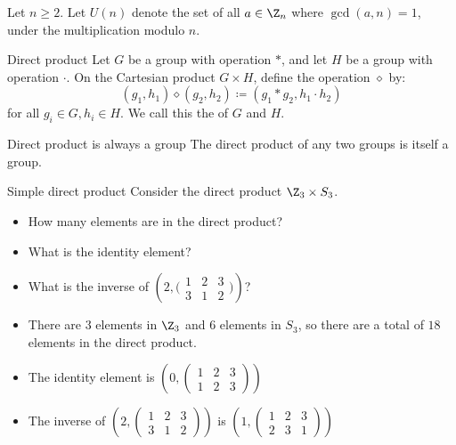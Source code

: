 Let $n \geq 2$. Let $U(n)$ denote the set of all $a \in \Z_n$ where $\gcd(a,n) = 1$, under the multiplication modulo $n$.

\begin{dfnbox}{Direct product}{}
    Let $G$ be a group with operation $*$, and let $H$ be a group with operation $\cdot$. On the Cartesian product $G \times H$, define the operation $\diamond$ by:
    \[ (g_1, h_1) \diamond (g_2, h_2) \coloneq (g_1 * g_2, h_1 \cdot h_2) \]
    for all $g_i \in G, h_i \in H$. We call this the  of $G$ and $H$.
\end{dfnbox}

\begin{thmbox}{Direct product is always a group}{}
    The direct product of any two groups is itself a group.
\end{thmbox}

\begin{exbox}{Simple direct product}{}
    Consider the direct product $\Z_3 \times S_3$.
    \begin{itemize}
        \item How many elements are in the direct product?
        \item What is the identity element?
        \item What is the inverse of $\left( 2, \big( \begin{smallmatrix} 1 & 2 & 3 \\ 3 & 1 & 2 \end{smallmatrix} \big) \right)$?
    \end{itemize}
    \tcblower
    \begin{itemize}
        \item There are $3$ elements in $\Z_3$ and $6$ elements in $S_3$, so there are a total of $18$ elements in the direct product.
        \item The identity element is $\left( 0, \begin{pmatrix} 1 & 2 & 3 \\ 1 & 2 & 3 \end{pmatrix} \right)$
        \item The inverse of $\left( 2, \begin{pmatrix} 1 & 2 & 3 \\ 3 & 1 & 2 \end{pmatrix} \right)$ is $\left(1, \begin{pmatrix} 1 & 2 & 3 \\ 2 & 3 & 1 \end{pmatrix} \right)$
    \end{itemize}
\end{exbox}


